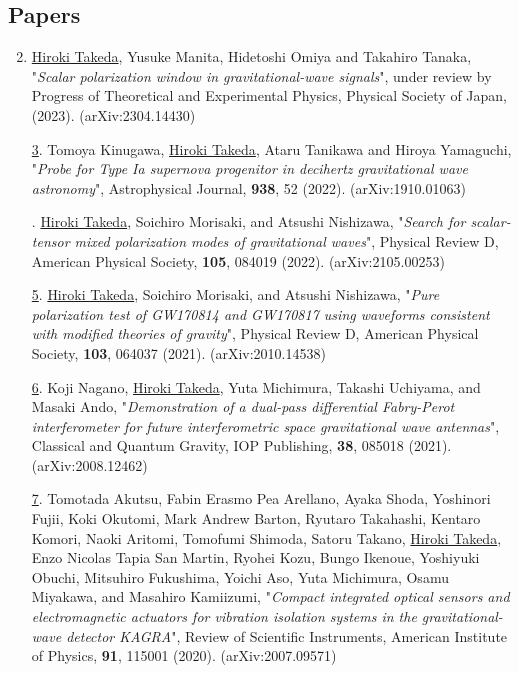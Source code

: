 \documentclass[uplatex, 12pt]{article}
\newcommand{\ctext}[1]{\ooalign{
\hfil\resizebox{\width}{\height}{#1}\hfil
\crcr
\raise.2mm\hbox{\large$\bigcirc$}}}
\begin{document}
\subsection*{Papers}
\begin{enumerate}
\setcounter{enumi}{1}
\item \uline{Hiroki Takeda}, Yusuke Manita, Hidetoshi Omiya and Takahiro Tanaka, "\emph{Scalar polarization window in gravitational-wave signals}", under review by Progress of Theoretical and Experimental Physics, Physical Society of Japan, (2023). (arXiv:2304.14430)\\

\item[\uline{3}.] Tomoya Kinugawa, \uline{Hiroki Takeda}, Ataru Tanikawa and Hiroya Yamaguchi, "\emph{Probe for Type Ia supernova progenitor in decihertz gravitational wave astronomy}", Astrophysical Journal, {\bf 938}, 52 (2022). (arXiv:1910.01063)\\

\item[\uline{\ctext{4}}.] \uline{Hiroki Takeda}, Soichiro Morisaki, and Atsushi Nishizawa,
"\emph{Search for scalar-tensor mixed polarization modes of gravitational waves}",
Physical Review D, American Physical Society, {\bf 105}, 084019 (2022).
(arXiv:2105.00253)\\

   \item[\uline{5}.] \uline{Hiroki Takeda}, Soichiro Morisaki, and Atsushi Nishizawa, "\emph{Pure polarization test of GW170814 and GW170817 using waveforms consistent with modified theories of gravity}", Physical Review D, American Physical Society, {\bf 103}, 064037 (2021). (arXiv:2010.14538)\\
   
\item[\uline{6}.] Koji Nagano, \uline{Hiroki Takeda}, Yuta Michimura, Takashi Uchiyama, and Masaki Ando, "\emph{Demonstration of a dual-pass differential Fabry-Perot interferometer for future interferometric space gravitational wave antennas}", Classical and Quantum Gravity, IOP Publishing, {\bf 38}, 085018 (2021). (arXiv:2008.12462)\\
  
\item[\uline{7}.] Tomotada Akutsu, Fabin Erasmo Pea Arellano, Ayaka Shoda, Yoshinori Fujii, Koki Okutomi, Mark Andrew Barton, Ryutaro Takahashi, Kentaro Komori, Naoki Aritomi, Tomofumi Shimoda, Satoru Takano, \uline{Hiroki Takeda}, Enzo Nicolas Tapia San Martin, Ryohei Kozu, Bungo Ikenoue, Yoshiyuki Obuchi, Mitsuhiro Fukushima, Yoichi Aso, Yuta Michimura, Osamu Miyakawa, and Masahiro Kamiizumi, "\emph{Compact integrated optical sensors and electromagnetic actuators for vibration isolation systems in the gravitational-wave detector KAGRA}", Review of Scientific Instruments, American Institute of Physics, {\bf 91}, 115001 (2020). (arXiv:2007.09571)\\


\end{enumerate}
\end{document}
